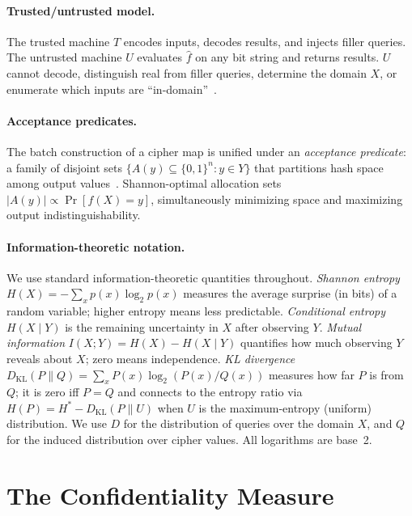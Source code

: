 \documentclass[11pt]{article}
\theoremstyle{definition}
\theoremstyle{plain}
\theoremstyle{remark}
\newcommand{\fhat}{\hat{f}}
\newcommand{\B}{\{0,1\}}
\begin{document}
\paragraph{Trusted/untrusted model.}
The trusted machine $T$ encodes inputs, decodes results, and injects
filler queries.  The untrusted machine $U$ evaluates $\fhat$ on any bit
string and returns results.  $U$ cannot decode, distinguish real from
filler queries, determine the domain $X$, or enumerate which inputs are
``in-domain''~\cite[Sec.~5]{towell2026cipher}.

\paragraph{Acceptance predicates.}
The batch construction of a cipher map is unified under an
\emph{acceptance predicate}: a family of disjoint sets
$\{A(y) \subseteq \B^n : y \in Y\}$ that partitions hash space among
output values~\cite[Sec.~6.2]{towell2026cipher}.  Shannon-optimal
allocation sets $|A(y)| \propto \Pr[f(X) = y]$, simultaneously
minimizing space and maximizing output indistinguishability.

\paragraph{Information-theoretic notation.}
We use standard information-theoretic quantities throughout.
\emph{Shannon entropy} $H(X) = -\sum_x p(x) \log_2 p(x)$ measures the
average surprise (in bits) of a random variable; higher entropy means
less predictable.
\emph{Conditional entropy} $H(X \mid Y)$ is the remaining uncertainty in
$X$ after observing $Y$.
\emph{Mutual information} $I(X; Y) = H(X) - H(X \mid Y)$ quantifies how
much observing $Y$ reveals about $X$; zero means independence.
\emph{KL divergence} $D_{\mathrm{KL}}(P \| Q) = \sum_x P(x) \log_2
(P(x)/Q(x))$ measures how far $P$ is from $Q$; it is zero iff $P = Q$
and connects to the entropy ratio via $H(P) = H^* - D_{\mathrm{KL}}(P
\| U)$ when $U$ is the maximum-entropy (uniform) distribution.
We use $D$ for the distribution of queries over the domain $X$, and $Q$
for the induced distribution over cipher values.
All logarithms are base~2.


\section{The Confidentiality Measure}
\label{sec:measure}
\end{document}
